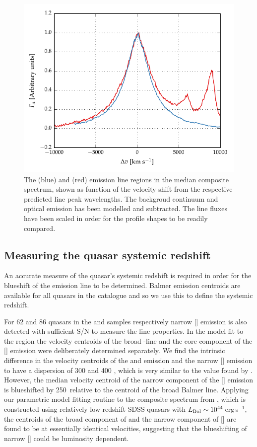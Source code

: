 \begin{figure}
    \centering 
    \includegraphics[width=0.8\linewidth]{figures/chapter03/ha_hb_composite.pdf} 
    \caption{The \ha (blue) and \hb (red) emission line regions in the median composite spectrum, shown as function of the velocity shift from the respective predicted line peak wavelengths. The backgroud continuum and optical  emission has been modelled and subtracted. The line fluxes have been scaled in order for the profile shapes to be readily compared.}
    \label{fig:balmer_composite}
\end{figure}


\subsection{Measuring the quasar systemic redshift}
\label{sec:zsys}

An accurate measure of the quasar's systemic redshift is required in order for the blueshift of the  emission line to be determined.
Balmer emission centroids are available for all quasars in the catalogue and so we use this to define the systemic redshift.

For 62 and 86 quasars in the \ha and \hb samples respectively narrow [] emission is also detected with sufficient S/N to measure the line properties. 
In the model fit to the \hb region the velocity centroids of the broad \hbns-line and the core component of the [] emission were deliberately determined separately.
We find the intrinsic difference in the velocity centroids of the \ha and \hb emission and the narrow [] emission to have a dispersion of 300 and 400 \kms, which is very similar to the value found by \citet{shen16b}. 
However, the median velocity centroid of the narrow component of the [] emission is blueshifted by 250\kms\, relative to the centroid of the broad Balmer line. 
Applying our parametric model fitting routine to the composite spectrum from \citet{hewett10}, which is constructed using relatively low redshift SDSS quasars with $L_{\rm Bol}\sim10^{44}$\,erg\,s$^{-1}$, the centroids of the broad component of \hb and the narrow component of [] are found to be at essentially identical velocities, suggesting that the blueshifting of narrow [] could be luminosity dependent.

